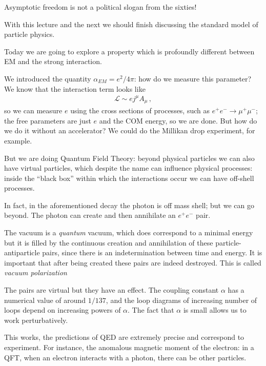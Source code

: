 \documentclass[main.tex]{subfiles}
\begin{document}

Asymptotic freedom is not a political slogan from the sixties!

With this lecture and the next we should finish discussing the standard model of particle physics. 

Today we are going to explore a property which is profoundly different between EM and the strong interaction. 

We introduced the quantity \(\alpha_{EM} = e^2 / 4 \pi \): how do we measure this parameter?
We know that the interaction term looks like 
%
\begin{align}
\mathscr{L} \sim e j^{\mu }A_{\mu }
\,,
\end{align}
%
so we can measure \(e\) using the cross sections of processes, such as \(e^{+} e^{-} \to \mu^{+} \mu^{-}\); the free parameters are just \(e\) and the COM energy, so we are done. 
But how do we do it without an accelerator? We could do the Millikan drop experiment, for example. 

But we are doing Quantum Field Theory: beyond physical particles we can also have virtual particles, which despite the name can influence physical processes: inside the ``black box'' within which the interactions occur we can have off-shell processes. 

In fact, in the aforementioned decay the photon is off mass shell; but we can go beyond. The photon can create and then annihilate an \(e^{+} e^{-}\) pair. 

The vacuum is a \emph{quantum} vacuum, which does correspond to a minimal energy but it is filled by the continuous creation and annihilation of these particle-antiparticle pairs, since there is an indetermination between time and energy. 
It is important that after being created these pairs are indeed destroyed.
This is called \emph{vacuum polarization}

The pairs are virtual but they have an effect. The coupling constant \(\alpha \) has a numerical value of around \(1 / 137\), and the loop diagrams of increasing number of loops depend on increasing powers of \(\alpha \). 
The fact that \(\alpha \) is small allows us to work perturbatively. 

This works, the predictions of QED are extremely precise and correspond to experiment.
For instance, the anomalous magnetic moment of the electron: in a QFT, when an electron interacts with a photon, there can be other particles. 
\end{document}
